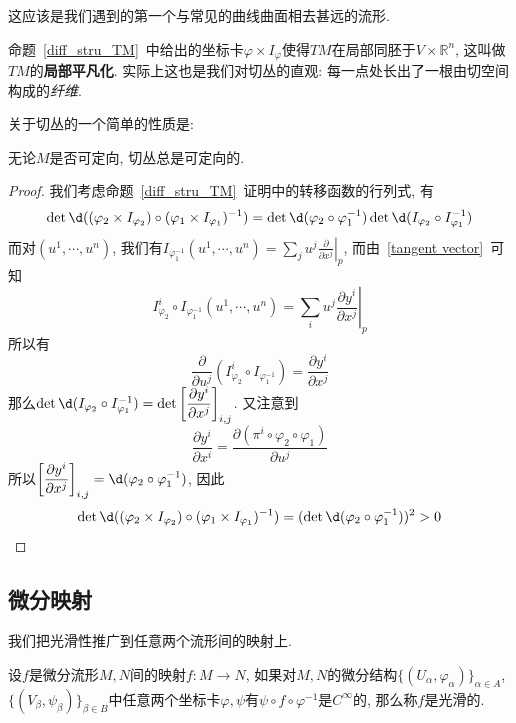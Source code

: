 这应该是我们遇到的第一个与常见的曲线曲面相去甚远的流形.

\begin{rem}
    命题~\ref{diff_stru_TM}~中给出的坐标卡$\varphi\times I_\varphi$使得$TM$在局部同胚于$V\times\mathbb{R}^n$, 这叫做$TM$的\textbf{局部平凡化}.\label{local trivialization}
    实际上这也是我们对切丛的直观: 每一点处长出了一根由切空间构成的\textit{纤维}.
\end{rem}

关于切丛的一个简单的性质是:
\begin{prop}
    无论$M$是否可定向, 切丛总是可定向的.
\end{prop}
\begin{proof}
    我们考虑命题~\ref{diff_stru_TM}~证明中的转移函数的行列式, 有
    \[\det\d((\varphi_2\times I_{\varphi_2})\circ(\varphi_1\times I_{\varphi_1})^{-1})=\det\d(\varphi_2\circ\varphi_1^{-1})\det\d(I_{\varphi_2}\circ I_{\varphi_1}^{-1})\]
    而对$(u^1,\cdots,u^n)$, 我们有$\displaystyle I_{\varphi_1^{-1}}(u^1,\cdots,u^n)=\left.\sum_{j}u^j\frac{\partial}{\partial x^j}\right|_p$, 而由~\eqref{tangent vector}~可知
    \[\displaystyle I_{\varphi_2}^i\circ I_{\varphi_1^{-1}}(u^1,\cdots,u^n)=\left.\sum_{i}u^j\frac{\partial y^i}{\partial x^j}\right|_p\]
    所以有
    \[\frac{\partial}{\partial u^j}(I_{\varphi_2}^i\circ I_{\varphi_1^{-1}})=\frac{\partial y^i}{\partial x^j}\]
    那么$\det\d(I_{\varphi_2}\circ I_{\varphi_1}^{-1})=\det\left[\dfrac{\partial y^i}{\partial x^j}\right]_{i,j}$.
    又注意到
    \[\frac{\partial y^i}{\partial x^i}=\frac{\partial(\pi^i\circ\varphi_2\circ\varphi_1)}{\partial u^j}\]
    所以$\left[\dfrac{\partial y^i}{\partial x^j}\right]_{i,j}=\d(\varphi_2\circ\varphi_1^{-1})$, 因此
    \[\det\d((\varphi_2\times I_{\varphi_2})\circ(\varphi_1\times I_{\varphi_1})^{-1})=(\det\d(\varphi_2\circ\varphi_1^{-1}))^2>0\qedhere\]
\end{proof}

\subsection*{微分映射}

我们把光滑性推广到任意两个流形间的映射上.

\begin{defn}\label{smooth function 2}
    设$f$是微分流形$M,N$间的映射$f:M\to N$, 如果对$M,N$的微分结构$\{(U_\alpha,\varphi_\alpha)\}_{\alpha\in A}$, $\{(V_\beta,\psi_\beta)\}_{\beta\in B}$中任意两个坐标卡$\varphi,\psi$有$\psi\circ f\circ\varphi^{-1}$是$C^\infty$的, 那么称$f$是光滑的.
\end{defn}

